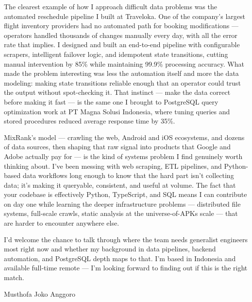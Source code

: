 \documentclass[11pt,a4paper]{article}
\begin{document}
The clearest example of how I approach difficult data problems was the automated reschedule pipeline I built at Traveloka. One of the company's largest flight inventory providers had no automated path for booking modifications — operators handled thousands of changes manually every day, with all the error rate that implies. I designed and built an end-to-end pipeline with configurable scrapers, intelligent failover logic, and idempotent state transitions, cutting manual intervention by 85\% while maintaining 99.9\% processing accuracy. What made the problem interesting was less the automation itself and more the data modeling: making state transitions reliable enough that an operator could trust the output without spot-checking it. That instinct — make the data correct before making it fast — is the same one I brought to PostgreSQL query optimization work at PT Magna Solusi Indonesia, where tuning queries and stored procedures reduced average response time by 35\%.

\vspace{6pt}

MixRank's model — crawling the web, Android and iOS ecosystems, and dozens of data sources, then shaping that raw signal into products that Google and Adobe actually pay for — is the kind of systems problem I find genuinely worth thinking about. I've been messing with web scraping, ETL pipelines, and Python-based data workflows long enough to know that the hard part isn't collecting data; it's making it queryable, consistent, and useful at volume. The fact that your codebase is effectively Python, TypeScript, and SQL means I can contribute on day one while learning the deeper infrastructure problems — distributed file systems, full-scale crawls, static analysis at the universe-of-APKs scale — that are harder to encounter anywhere else.

\vspace{6pt}

I'd welcome the chance to talk through where the team needs generalist engineers most right now and whether my background in data pipelines, backend automation, and PostgreSQL depth maps to that. I'm based in Indonesia and available full-time remote — I'm looking forward to finding out if this is the right match.

\vspace{16pt}

Musthofa Joko Anggoro
\end{document}
